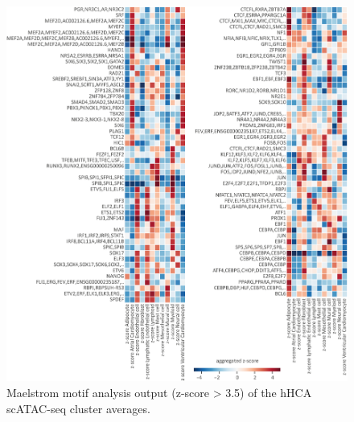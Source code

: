 \begin{figure}
    \centering
    \includegraphics[width=\linewidth]{ch.scepia/imgs/Maelstrom_AllHitsAbove3.5.png}
    \caption{Maelstrom motif analysis output (z-score > 3.5) of the hHCA scATAC-seq cluster averages.}
    \label{fig:scepia_maelstromhm}
\end{figure}
